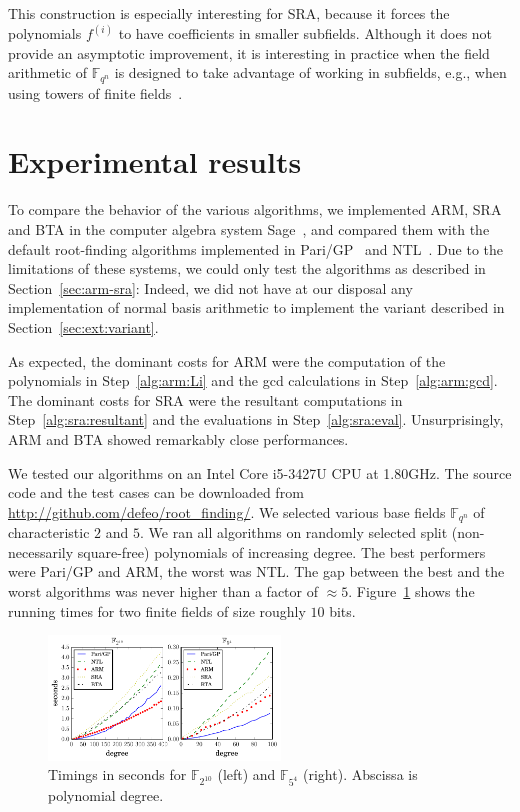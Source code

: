\documentclass{sig-alternate}
\newcommand{\ff}[1]{\mathbb{F}_{#1}}
\newcommand{\qq}{q}
\newcommand{\nn}{n}
\newcommand{\qn}{{\qq^\nn}}
\newcommand{\extf}{\ff{\qn}}
\newcounter{algo}
\begin{document}
This construction is especially interesting for SRA, because it forces
the polynomials $f^{(i)}$ to have coefficients in smaller
subfields. Although it does not provide an asymptotic improvement, it
is interesting in practice when the field arithmetic of $\extf$ is
designed to take advantage of working in subfields, e.g., when using
towers of finite fields~\cite{df+schost12,DeDoSc13}.



\section{Experimental results}

To compare the behavior of the various algorithms, we implemented ARM,
SRA and BTA in the computer algebra system Sage~\cite{Sage}, and
compared them with the default root-finding algorithms implemented in
Pari/GP~\cite{Pari} and NTL~\cite{ntl}. Due to the limitations of
these systems, we could only test the algorithms as described in
Section~\ref{sec:arm-sra}: Indeed, we did not have at our disposal any
implementation of normal basis arithmetic to implement the variant
described in Section~\ref{sec:ext:variant}.

As expected, the dominant costs for ARM were the computation of the
polynomials in Step~\ref{alg:arm:Li} and the gcd calculations in
Step~\ref{alg:arm:gcd}. The dominant costs for SRA were the resultant
computations in Step~\ref{alg:sra:resultant} and the evaluations in
Step~\ref{alg:sra:eval}. Unsurprisingly, ARM and BTA showed remarkably
close performances.

We tested our algorithms on an Intel Core i5-3427U CPU at 1.80GHz. The
source code and the test cases can be downloaded from
\url{http://github.com/defeo/root_finding/}. We selected various base
fields $\extf$ of characteristic $2$ and $5$. We ran all algorithms on
randomly selected split (non-necessarily square-free) polynomials of
increasing degree. The best performers were Pari/GP and ARM, the worst
was NTL. The gap between the best and the worst algorithms was never
higher than a factor of $\approx 5$. Figure~\ref{fig:benchmarks} shows
the running times for two finite fields of size roughly $10$ bits.

\begin{figure}
  \hspace{-0.05\textwidth}
  \includegraphics[width=0.55\textwidth]{benchmark}
  \caption{Timings in seconds for $\ff{2^{10}}$ (left) and $\ff{5^4}$
    (right). Abscissa is polynomial degree.}
  \label{fig:benchmarks}
\end{figure}
\end{document}
